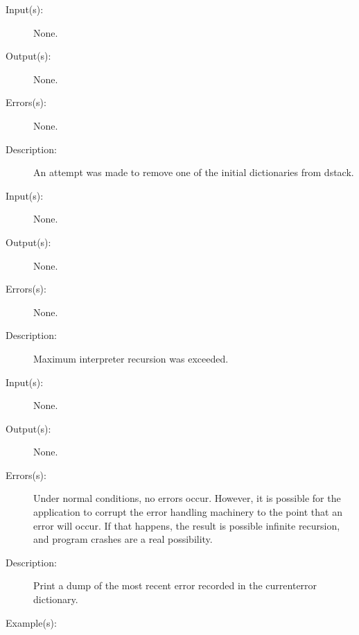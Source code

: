 \begin{description}
\label{dstackunderflow}
\label{errordict:dstackunderflow}
\item[{\onyxop{--}{dstackunderflow}{--}}: ]
	\begin{description}\item[]
	\item[Input(s): ] None.
	\item[Output(s): ] None.
	\item[Errors(s): ] None.
	\item[Description: ]
		An attempt was made to remove one of the initial dictionaries
		from dstack.
	\end{description}
\label{estackoverflow}
\label{errordict:estackoverflow}
\item[{\onyxop{--}{estackoverflow}{--}}: ]
	\begin{description}\item[]
	\item[Input(s): ] None.
	\item[Output(s): ] None.
	\item[Errors(s): ] None.
	\item[Description: ]
		Maximum interpreter recursion was exceeded.
	\end{description}
\label{handleerror}
\label{errordict:handleerror}
\item[{\onyxop{--}{handleerror}{--}}: ]
	\begin{description}\item[]
	\item[Input(s): ] None.
	\item[Output(s): ] None.
	\item[Errors(s): ]
		Under normal conditions, no errors occur.  However, it is
		possible for the application to corrupt the error handling
		machinery to the point that an error will occur.  If that
		happens, the result is possible infinite recursion, and program
		crashes are a real possibility.
	\item[Description: ]
		Print a dump of the most recent error recorded in the
		currenterror dictionary.
	\item[Example(s): ]\begin{verbatim}


\end{verbatim}
\end{description}
\end{description}
